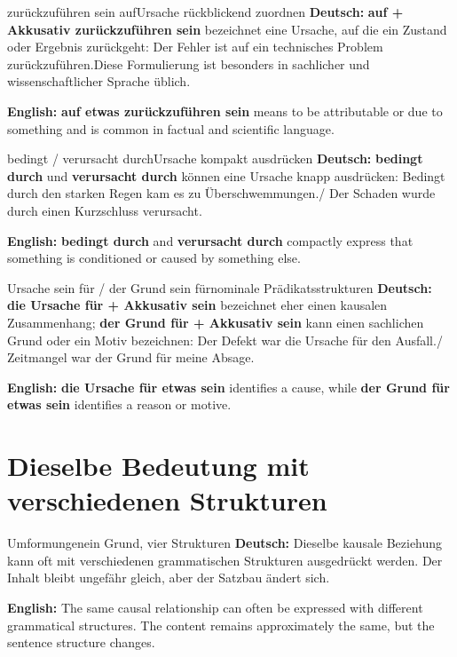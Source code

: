 \documentclass[a4paper,11pt]{article}
\newcommand{\GermanText}[1]{\textbf{Deutsch: }#1\par}
\newcommand{\EnglishText}[1]{{\small\color{SoftGray}\textbf{English: }#1\par}}
\begin{document}
        \begin{grammarentry}{zurückzuführen sein auf}{Ursache rückblickend zuordnen}
            \GermanText{\textbf{auf + Akkusativ zurückzuführen sein} bezeichnet eine Ursache, auf die ein Zustand oder Ergebnis zurückgeht: \glqq Der Fehler ist auf ein technisches Problem zurückzuführen.\grqq Diese Formulierung ist besonders in sachlicher und wissenschaftlicher Sprache üblich.}
            \EnglishText{\textbf{auf etwas zurückzuführen sein} means to be attributable or due to something and is common in factual and scientific language.}
        \end{grammarentry}

        \begin{grammarentry}{bedingt / verursacht durch}{Ursache kompakt ausdrücken}
            \GermanText{\textbf{bedingt durch} und \textbf{verursacht durch} können eine Ursache knapp ausdrücken: \glqq Bedingt durch den starken Regen kam es zu Überschwemmungen.\grqq / \glqq Der Schaden wurde durch einen Kurzschluss verursacht.\grqq}
            \EnglishText{\textbf{bedingt durch} and \textbf{verursacht durch} compactly express that something is conditioned or caused by something else.}
        \end{grammarentry}

        \begin{grammarentry}{Ursache sein für / der Grund sein für}{nominale Prädikatsstrukturen}
            \GermanText{\textbf{die Ursache für + Akkusativ sein} bezeichnet eher einen kausalen Zusammenhang; \textbf{der Grund für + Akkusativ sein} kann einen sachlichen Grund oder ein Motiv bezeichnen: \glqq Der Defekt war die Ursache für den Ausfall.\grqq / \glqq Zeitmangel war der Grund für meine Absage.\grqq}
            \EnglishText{\textbf{die Ursache für etwas sein} identifies a cause, while \textbf{der Grund für etwas sein} identifies a reason or motive.}
        \end{grammarentry}

    \section{Dieselbe Bedeutung mit verschiedenen Strukturen}

        \begin{grammarentry}{Umformungen}{ein Grund, vier Strukturen}
            \GermanText{Dieselbe kausale Beziehung kann oft mit verschiedenen grammatischen Strukturen ausgedrückt werden. Der Inhalt bleibt ungefähr gleich, aber der Satzbau ändert sich.}
            \EnglishText{The same causal relationship can often be expressed with different grammatical structures. The content remains approximately the same, but the sentence structure changes.}
        \end{grammarentry}
\end{document}
